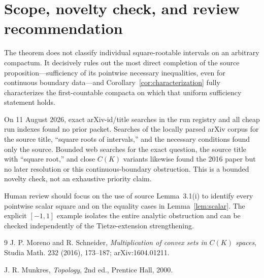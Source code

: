 \documentclass[11pt]{article}
\begin{document}
\section{Scope, novelty check, and review recommendation}

The theorem does not classify individual square-rootable intervals on an
arbitrary compactum.  It decisively rules out the most direct completion of
the source proposition---sufficiency of its pointwise necessary inequalities,
even for continuous boundary data---and Corollary~\ref{cor:characterization}
fully characterizes the first-countable compacta on which that uniform
sufficiency statement holds.

On 11 August 2026, exact arXiv-id/title searches in the run registry and all
cheap run indexes found no prior packet.  Searches of the locally parsed arXiv
corpus for the source title, ``square roots of intervals,'' and the necessary
conditions found only the source.  Bounded web searches for the exact question,
the source title with ``square root,'' and close $C(K)$ variants likewise found
the 2016 paper but no later resolution or this continuous-boundary obstruction.
This is a bounded novelty check, not an exhaustive priority claim.

Human review should focus on the use of source Lemma~3.1(i) to identify every
pointwise scalar square and on the equality cases in Lemma~\ref{lem:scalar}.
The explicit $[-1,1]$ example isolates the entire analytic obstruction and
can be checked independently of the Tietze-extension strengthening.

\begin{thebibliography}{9}
J. P. Moreno and R. Schneider,
\emph{Multiplication of convex sets in $C(K)$ spaces},
Studia Math. 232 (2016), 173--187; arXiv:1604.01211.

J. R. Munkres,
\emph{Topology}, 2nd ed., Prentice Hall, 2000.
\end{thebibliography}
\end{document}
